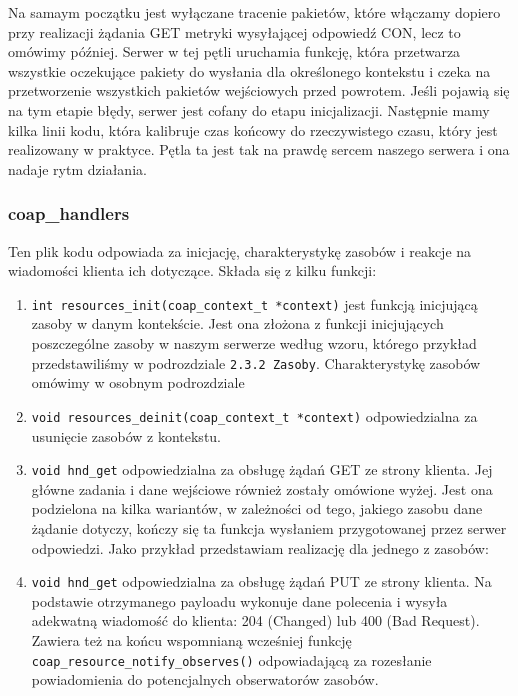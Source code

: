 Na samaym początku jest wyłączane tracenie pakietów, które włączamy dopiero przy realizacji żądania GET metryki wysyłającej odpowiedź CON, lecz to omówimy później. Serwer w tej pętli uruchamia funkcję, która przetwarza wszystkie oczekujące pakiety do wysłania dla określonego kontekstu i czeka na przetworzenie wszystkich pakietów wejściowych przed powrotem. Jeśli pojawią się na tym etapie błędy, serwer jest cofany do etapu inicjalizacji. Następnie mamy kilka linii kodu, która kalibruje czas końcowy do rzeczywistego czasu, który jest realizowany w praktyce.
Pętla ta jest tak na prawdę sercem naszego serwera i ona nadaje rytm działania.

\subsubsection{coap\_handlers}

Ten plik kodu odpowiada za inicjację, charakterystykę zasobów i reakcje na wiadomości klienta ich dotyczące. Składa się z kilku funkcji:

\begin{enumerate}
    \item \verb|int resources_init(coap_context_t *context)| jest funkcją inicjującą zasoby w danym kontekście. Jest ona złożona z funkcji inicjujących poszczególne zasoby w naszym serwerze według wzoru, którego przykład przedstawiliśmy w podrozdziale \verb|2.3.2 Zasoby|. Charakterystykę zasobów omówimy w osobnym podrozdziale
    \item \verb|void resources_deinit(coap_context_t *context)| odpowiedzialna za usunięcie zasobów z kontekstu.
    \item \verb|void hnd_get| odpowiedzialna za obsługę żądań GET ze strony klienta. Jej główne zadania i dane wejściowe również zostały omówione wyżej. Jest ona podzielona na kilka wariantów, w zależności od tego, jakiego zasobu dane żądanie dotyczy, kończy się ta funkcja wysłaniem przygotowanej przez serwer odpowiedzi. Jako przykład przedstawiam realizację dla jednego z zasobów:

\vspace{0.5cm}

\vspace{0.5cm}

    \item  \verb|void hnd_get| odpowiedzialna za obsługę żądań PUT ze strony klienta. Na podstawie otrzymanego payloadu wykonuje dane polecenia i wysyła adekwatną wiadomość do klienta: 204 (Changed) lub 400 (Bad Request). Zawiera też na końcu wspomnianą wcześniej funkcję \verb|coap_resource_notify_observes()| odpowiadającą za rozesłanie powiadomienia do potencjalnych obserwatorów zasobów.
\end{enumerate}

